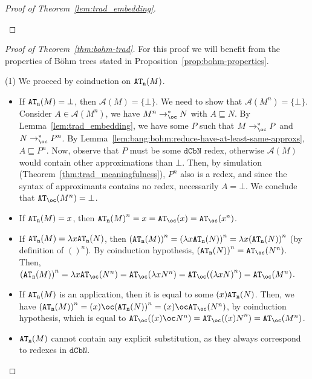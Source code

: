 \documentclass[10pt,a4paper]{article}
\newcommand{\<}{\langle}
\renewcommand{\>}{\rangle}
\newcommand{\dcbn}{\ensuremath{\mathtt{dCbN}}}
\newcommand{\todbf}{\to_{\oc}} %
\newcommand{\tradn}[1]{\ensuremath{{#1}^n}}
\newcommand{\mcal}[1]{\ensuremath{\mathcal{#1}}}
\newcommand{\setApprox}{\mcal{A}}
\newcommand{\setapprox}{\setApprox}
\newcommand{\btb}{\ensuremath{{\tt{AT}_\oc}}}
\newcommand{\btn}{\ensuremath{{\tt{AT}_n}}}
\newcommand{\smaller}{\ensuremath{\sqsubseteq}}
\begin{document}
\begin{proof}[Proof of Theorem~\ref{lem:trad_embedding}]
\begin{itemize}
\begin{itemize}
			\end{itemize}
	\end{itemize}
\end{proof}

\begin{proof}[Proof of Theorem~\ref{thm:bohm-trad}]
	For this proof we will benefit from the properties of Böhm trees stated
	in Proposition~\ref{prop:bohm-properties}.

	(1) We proceed by coinduction on $\btn(M)$. 
	\begin{itemize}
		\item If $\btn(M)=\bot$, then $\setapprox (M)=\{\bot\}$. We need
			to show that $\setapprox(\tradn M)=\{\bot\}$. Consider
			$A\in\setapprox(\tradn M)$, we have $\tradn M\todbf^*N$
			with $A\sqsubseteq N$. By
			Lemma~\ref{lem:trad_embedding}, we have some $P$ such
			that $M\todbf^*P$ and $N\todbf^*\tradn P$. By
			Lemma~\ref{lem:bang:bohm:reduce-have-at-least-same-approxs},
			$A\smaller \tradn P$. Now, observe that $P$ must be some
			$\dcbn$ redex, otherwise $\setapprox(M)$ would contain
			other approximations than $\bot$. Then, by simulation
			(Theorem~\ref{thm:trad_meaningfulness}), $\tradn P$ also
			is a redex, and since the syntax of approximants
			contains no redex, necessarily $A=\bot$. We conclude
			that $\btb(\tradn M)=\bot$.
		\item If $\btn(M)=x$, then
			$\tradn{\btn(M)}=x=\btb(x)=\btb(\tradn x)$.
		\item If $\btn(M)=\lambda x\btn(N)$, then
			$\tradn{(\btn(M))}=\tradn{(\lambda x\btn(N))}=\lambda
			x\tradn{(\btn(N))}$ (by definition of $\tradn{()}$). By
			coinduction hypothesis, $\tradn{(\btn(N))}=\btb(\tradn
			N)$. Then, $\tradn{(\btn(M))}=\lambda x\btb(\tradn
			N)=\btb(\lambda x\tradn N)=\btb(\tradn{(\lambda x
			N)})=\btb(\tradn M)$.
		\item If $\btn(M)$ is an application, then it is equal to
			some $(x)\btn(N)$. Then, we have
			$\tradn{(\btn(M))}=(x)\oc\tradn{(\btn(N))}=
			(x)\oc\btb(\tradn N)$, by coinduction hypothesis,
			which is equal to $\btb((x)\oc \tradn
			N)=\btb(\tradn{(x)N})=\btb(\tradn M)$.
		\item $\btn(M)$ cannot contain any explicit substitution, as they
			always correspond to redexes in $\dcbn$.
	\end{itemize}
	

\end{proof}
\end{document}
